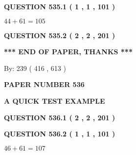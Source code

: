 \documentclass[12pt]{article}
\begin{document}
{\textbf{\Large{QUESTION
535.1 
 ( 1 , 1 , 101 )
}}}
  
  
 
 

$ %
44 +  %
61=   %
105$
 
 
  
\vspace{0.2in}
  
{\textbf{\Large{QUESTION
535.2 
 ( 2 , 2 , 201 )
}}}
  
  
   
   
 \vspace{0.2in}
 
   
   
   
   
\vspace{1.0in} 
{\textbf{\large{ *** END OF PAPER, THANKS *** }}} 
   
   
\hspace{1.0in} By: 
 239 ( 416 ,  613 )
   
   
   
   
\newpage 
\setcounter{page}{ 
   536001 } 
   
   
   
   
 {\textbf{ \Large{ PAPER NUMBER  536  }}}
   
   
\vspace{0.2in}
   
   
   
   
   
   
 \vspace{0.2in}
{\LARGE {\textbf{ A QUICK TEST EXAMPLE}}}
   
   
  
\vspace{0.2in}
  
{\textbf{\Large{QUESTION
536.1 
 ( 2 , 2 , 201 )
}}}
  
  
  
\vspace{0.2in}
  
{\textbf{\Large{QUESTION
536.2 
 ( 1 , 1 , 101 )
}}}
  
  
 
 

$ %
46 +  %
61=   %
107$
 
 
   
   
 \vspace{0.2in}
 
   
   
\end{document}
